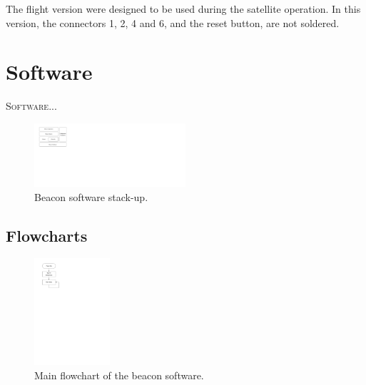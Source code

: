 \documentclass[12pt]{book}
\begin{document}
The flight version were designed to be used during the satellite operation. In this version, the connectors 1, 2, 4 and 6, and the reset button, are not soldered.


\chapter{Software}

\lettrine{S}{oftware}...


\begin{figure}[!h]
	\begin{center}
		\includegraphics[width=0.5\textwidth]{figures/beacon_software_layers.pdf}
		\caption{Beacon software stack-up.}
		\label{fig:beacon-software-layers}
	\end{center}
\end{figure}

\section{Flowcharts}

\begin{figure}[!h]
	\begin{center}
		\includegraphics[width=0.25\textwidth]{figures/beacon_main_flowchart.pdf}
		\caption{Main flowchart of the beacon software.}
		\label{fig:beacon-main-flowchart}
	\end{center}
\end{figure}
\end{document}
